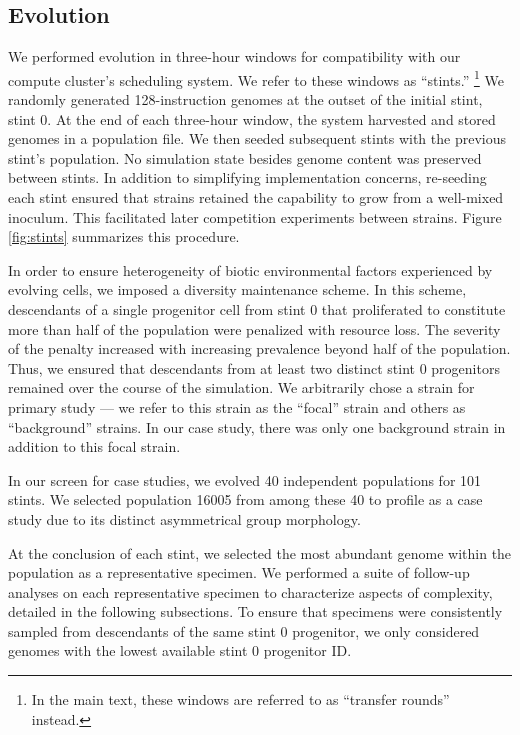 
\subsection{Evolution}
\label{sec:evolution;ch:measuring-cna}



We performed evolution in three-hour windows for compatibility with our compute cluster's scheduling system.
We refer to these windows as ``stints.''
\unskip\footnote{In the main text, these windows are referred to as ``transfer rounds'' instead.}
We randomly generated 128-instruction genomes at the outset of the initial stint, stint 0.
At the end of each three-hour window, the system harvested and stored genomes in a population file.
We then seeded subsequent stints with the previous stint's population.
No simulation state besides genome content was preserved between stints.
In addition to simplifying implementation concerns, re-seeding each stint ensured that strains retained the capability to grow from a well-mixed inoculum.
This facilitated later competition experiments between strains.
Figure \ref{fig:stints} summarizes this procedure.

In order to ensure heterogeneity of biotic environmental factors experienced by evolving cells, we imposed a diversity maintenance scheme.
In this scheme, descendants of a single progenitor cell from stint 0 that proliferated to constitute more than half of the population were penalized with resource loss.
The severity of the penalty increased with increasing prevalence beyond half of the population.
Thus, we ensured that descendants from at least two distinct stint 0 progenitors remained over the course of the simulation.
We arbitrarily chose a strain for primary study --- we refer to this strain as the ``focal'' strain and others as ``background'' strains.
In our case study, there was only one background strain in addition to this focal strain.

In our screen for case studies, we evolved 40 independent populations for 101 stints.
We selected population 16005 from among these 40 to profile as a case study due to its distinct asymmetrical group morphology.

At the conclusion of each stint, we selected the most abundant genome within the population as a representative specimen.
We performed a suite of follow-up analyses on each representative specimen to characterize aspects of complexity, detailed in the following subsections.
To ensure that specimens were consistently sampled from descendants of the same stint 0 progenitor, we only considered genomes with the lowest available stint 0 progenitor ID.

